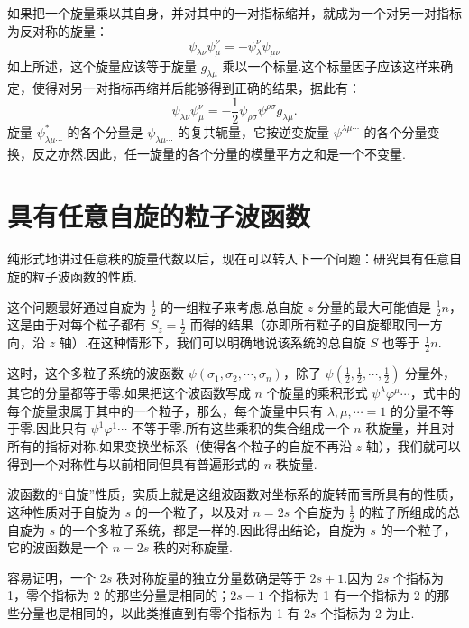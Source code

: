 如果把一个旋量乘以其自身，并对其中的一对指标缩并，就成为一个对另一对指标为反对称的旋量：
\begin{equation*}
  \psi_{\lambda\nu}\psi^{\nu}_{\mu}=-\psi^{\nu}_{\lambda}\psi_{\mu\nu}
\end{equation*}
如上所述，这个旋量应该等于旋量 $g_{\lambda\mu}$ 乘以一个标量.这个标量因子应该这样来确定，使得对另一对指标再缩并后能够得到正确的结果，据此有：
\begin{equation}
  \psi_{\lambda\nu}\psi^{\nu}_{\mu}
  =-\frac{1}{2}\psi_{\rho\sigma}\psi^{\rho\sigma}g_{\lambda\mu}.
\end{equation}
旋量 $\psi^{*}_{\lambda\mu\cdots}$ 的各个分量是 $\psi_{\lambda\mu\cdots}$ 的复共轭量，它按逆变旋量 $\psi^{\lambda\mu\cdots}$ 的各个分量变换，反之亦然.因此，任一旋量的各个分量的模量平方之和是一个不变量.

\section{具有任意自旋的粒子波函数}

纯形式地讲过任意秩的旋量代数以后，现在可以转入下一个问题：研究具有任意自旋的粒子波函数的性质.

这个问题最好通过自旋为 $\frac{1}{2}$ 的一组粒子来考虑.总自旋 $z$ 分量的最大可能值是 $\frac{1}{2}n$，这是由于对每个粒子都有 $S_z=\frac{1}{2}$ 而得的结果（亦即所有粒子的自旋都取同一方向，沿 $z$ 轴）.在这种情形下，我们可以明确地说该系统的总自旋 $S$ 也等于 $\frac{1}{2}n$.

这时，这个多粒子系统的波函数 $\psi(\sigma_1,\sigma_2,\cdots,\sigma_n)$，除了 $\psi\left(\frac{1}{2},\frac{1}{2},\cdots,\frac{1}{2}\right)$ 分量外，其它的分量都等于零.如果把这个波函数写成 $n$ 个旋量的乘积形式 $\psi^{\lambda}\varphi^{\mu}\cdots$，式中的每个旋量隶属于其中的一个粒子，那么，每个旋量中只有 $\lambda,\mu,\cdots=1$ 的分量不等于零.因此只有 $\psi^1\varphi^1\cdots$ 不等于零.所有这些乘积的集合组成一个 $n$ 秩旋量，并且对所有的指标对称.如果变换坐标系（使得各个粒子的自旋不再沿 $z$ 轴），我们就可以得到一个对称性与以前相同但具有普遍形式的 $n$ 秩旋量.

波函数的“自旋”性质，实质上就是这组波函数对坐标系的旋转而言所具有的性质，这种性质对于自旋为 $s$ 的一个粒子，以及对 $n=2s$ 个自旋为 $\frac{1}{2}$ 的粒子所组成的总自旋为 $s$ 的一个多粒子系统，都是一样的.因此得出结论，自旋为 $s$ 的一个粒子，它的波函数是一个 $n=2s$ 秩的对称旋量.

容易证明，一个 $2s$ 秩对称旋量的独立分量数确是等于 $2s+1$.因为 $2s$ 个指标为 1，零个指标为 2 的那些分量是相同的；$2s-1$ 个指标为 1 有一个指标为 2 的那些分量也是相同的，以此类推直到有零个指标为 1 有 $2s$ 个指标为 2 为止.

